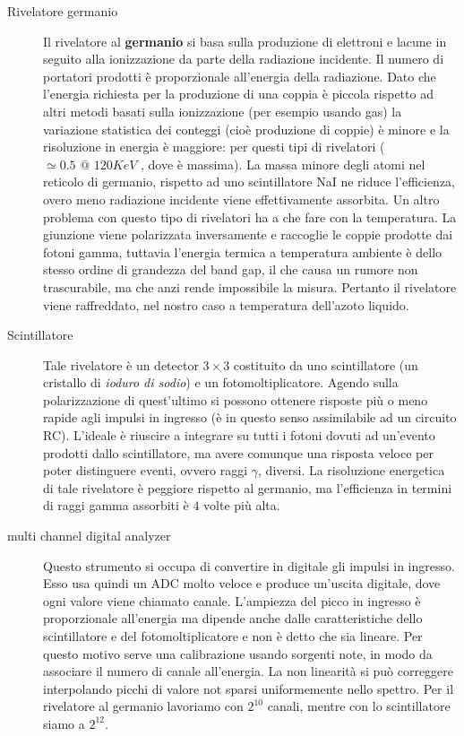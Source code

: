 \documentclass[11pt,a4paper]{article}
\begin{document}
\begin{description}
  \item[Rivelatore germanio] Il rivelatore al \textbf{germanio} si basa sulla produzione di elettroni e lacune in seguito alla ionizzazione da parte della radiazione incidente. Il numero di portatori prodotti è proporzionale all'energia della radiazione. Dato che l'energia richiesta per la produzione di una coppia è piccola rispetto ad altri metodi basati sulla ionizzazione (per esempio usando gas) la variazione statistica dei conteggi (cioè produzione di coppie) è minore e la risoluzione in energia è maggiore: per questi tipi di rivelatori ($\simeq 0.5 \text{ @ } 120 KeV$ , dove è massima).%
  La massa minore degli atomi nel reticolo di germanio, rispetto ad uno scintillatore NaI ne riduce l'efficienza, overo meno radiazione incidente viene effettivamente assorbita.
  Un altro problema con questo tipo di rivelatori ha a che fare con la temperatura. La giunzione viene polarizzata inversamente e raccoglie le coppie prodotte dai fotoni gamma, tuttavia l'energia termica a temperatura ambiente è dello stesso ordine di grandezza del band gap, il che causa un rumore non trascurabile, ma che anzi rende impossibile la misura. Pertanto il rivelatore viene raffreddato, nel nostro caso a temperatura dell'azoto liquido.
  \item [Scintillatore] Tale rivelatore è un detector $3\times3$ costituito da uno scintillatore (un cristallo di \textit{ioduro di sodio}) e un fotomoltiplicatore. Agendo sulla polarizzazione di quest'ultimo si possono ottenere risposte più o meno rapide agli impulsi in ingresso (è in questo senso assimilabile ad un circuito RC). L'ideale è riuscire a integrare su tutti i fotoni dovuti ad un'evento prodotti dallo scintillatore, ma avere comunque una risposta veloce per poter distinguere eventi, ovvero raggi $\gamma$, diversi. La risoluzione energetica di tale rivelatore è peggiore rispetto al germanio, ma l'efficienza in termini di raggi gamma assorbiti è $4$ volte più alta.
  \item [multi channel digital analyzer] Questo strumento si occupa di convertire in digitale gli impulsi in ingresso. Esso usa quindi un ADC molto veloce e produce un'uscita digitale, dove ogni valore viene chiamato canale. L'ampiezza del picco in ingresso è proporzionale all'energia ma dipende anche dalle caratteristiche dello scintillatore e del fotomoltiplicatore e non è detto che sia lineare. Per questo motivo serve una calibrazione usando sorgenti note, in modo da associare il numero di canale all'energia. La non linearità si può correggere interpolando picchi di valore not sparsi uniformemente nello spettro. Per il rivelatore al germanio lavoriamo con $2^{10}$ canali, mentre con lo scintillatore siamo a $2^{12}$.

\end{description}
\end{document}
